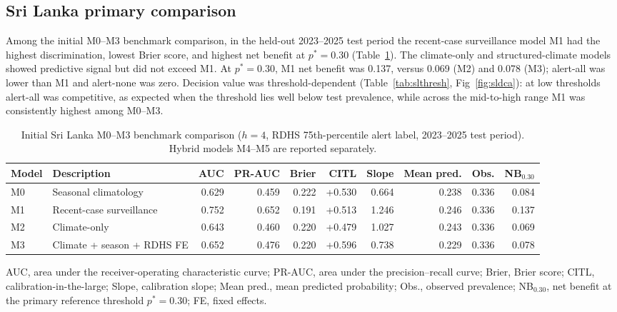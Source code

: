 \documentclass[11pt,a4paper]{article}
\begin{document}
\subsection{Sri Lanka primary comparison}
Among the initial M0--M3 benchmark comparison, in the held-out 2023--2025 test period the recent-case surveillance model M1 had the highest discrimination, lowest Brier score, and highest net benefit at $p^*=0.30$ (Table~\ref{tab:slprimary}). The climate-only and structured-climate models showed predictive signal but did not exceed M1. At $p^*=0.30$, M1 net benefit was 0.137, versus 0.069 (M2) and 0.078 (M3); alert-all was lower than M1 and alert-none was zero. Decision value was threshold-dependent (Table~\ref{tab:slthresh}, Fig~\ref{fig:sldca}): at low thresholds alert-all was competitive, as expected when the threshold lies well below test prevalence, while across the mid-to-high range M1 was consistently highest among M0--M3.

\begin{table}[htbp]
\centering
\caption{Initial Sri Lanka M0--M3 benchmark comparison ($h=4$, RDHS 75th-percentile alert label, 2023--2025 test period). Hybrid models M4--M5 are reported separately.}
\label{tab:slprimary}
\begin{threeparttable}\footnotesize
\setlength{\tabcolsep}{3.6pt}
\begin{tabular}{llrrrrrrrr}
\toprule
Model & Description & AUC & PR-AUC & Brier & CITL & Slope & Mean pred. & Obs. & NB$_{0.30}$ \\
\midrule
M0 & Seasonal climatology & 0.629 & 0.459 & 0.222 & +0.530 & 0.664 & 0.238 & 0.336 & 0.084 \\
M1 & Recent-case surveillance & 0.752 & 0.652 & 0.191 & +0.513 & 1.246 & 0.246 & 0.336 & 0.137 \\
M2 & Climate-only & 0.643 & 0.460 & 0.220 & +0.479 & 1.027 & 0.243 & 0.336 & 0.069 \\
M3 & Climate + season + RDHS FE & 0.652 & 0.476 & 0.220 & +0.596 & 0.738 & 0.229 & 0.336 & 0.078 \\
\bottomrule
\end{tabular}
\begin{tablenotes}\footnotesize
\item AUC, area under the receiver-operating characteristic curve; PR-AUC, area under the precision--recall curve; Brier, Brier score; CITL, calibration-in-the-large; Slope, calibration slope; Mean pred., mean predicted probability; Obs., observed prevalence; NB$_{0.30}$, net benefit at the primary reference threshold $p^*=0.30$; FE, fixed effects.
\end{tablenotes}
\end{threeparttable}
\end{table}
\end{document}

